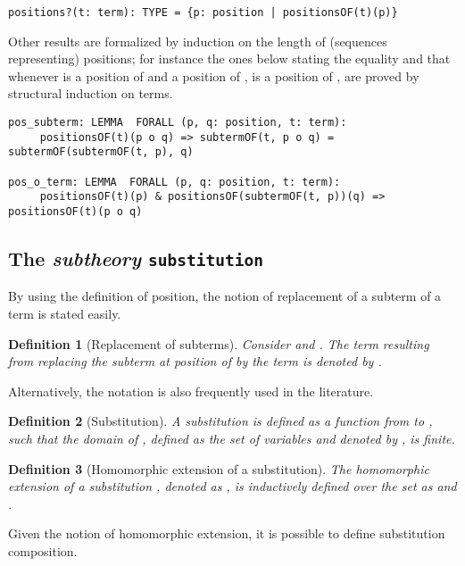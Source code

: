 \documentclass[submission,copyright,creativecommons]{eptcs}
\newtheorem{definition}{Definition}
\begin{document}
    {\small
\begin{verbatim}
positions?(t: term): TYPE = {p: position | positionsOF(t)(p)}
\end{verbatim}}

      Other results are formalized
      by induction on the length of (sequences representing)
      positions; for instance the ones below stating the equality
       and that whenever  is a position of
       and  a position of ,  is a position of ,
      are proved by structural induction on terms.

      {\small
\begin{verbatim}
pos_subterm: LEMMA  FORALL (p, q: position, t: term):
     positionsOF(t)(p o q) => subtermOF(t, p o q) = subtermOF(subtermOF(t, p), q)

pos_o_term: LEMMA  FORALL (p, q: position, t: term):
     positionsOF(t)(p) & positionsOF(subtermOF(t, p))(q) => positionsOF(t)(p o q)
\end{verbatim}}

        \subsection{The \emph{subtheory} {\tt substitution} }

        By using the definition of position, the notion of replacement
        of a subterm of a term is stated easily.

\begin{definition}[Replacement of subterms]
  Consider  and . The term resulting
  from replacing the subterm at position  of  by the term 
  is denoted by .
\end{definition}

Alternatively, the notation  is also frequently used in the
literature.

\begin{definition}[Substitution]
  A substitution  is defined as a function from  to
  , such that the domain of , defined as the set
  of variables  and denoted by
  , is finite.
\end{definition}

\begin{definition}[Homomorphic extension of a substitution]
  The homomorphic extension of a substitution , denoted as
  , is inductively defined over the set 
  as  and .
\end{definition}

Given the notion of homomorphic extension, it is possible to define
substitution composition.
\end{document}
